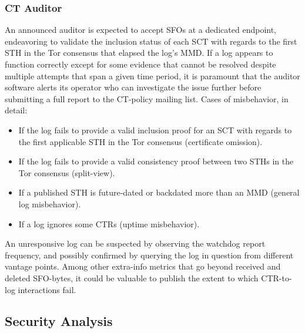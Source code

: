 \subsubsection{CT Auditor} \label{sec:auditor:auditor}
An announced auditor is expected to accept SFOs at a dedicated endpoint,
endeavoring to validate the inclusion status of each SCT with regards to the
first STH in the Tor consensus that elapsed the log's MMD.  If a log appears to
function correctly except for some evidence that cannot be
resolved despite multiple attempts that span a given time period, it is
paramount that the auditor software alerts its operator who can investigate
the issue further before submitting a full report to the CT-policy mailing list.
Cases of misbehavior, in detail:
\begin{itemize}
	\item If the log fails to provide a valid inclusion proof for an SCT with
		regards to the first applicable STH in the Tor consensus
		(certificate omission).
	\item If the log fails to provide a valid consistency proof between two
		STHs in the Tor consensus
		(split-view).
	\item If a published STH is future-dated or backdated more than an MMD
		(general log misbehavior).
	\item If a log ignores some CTRs (uptime misbehavior).
\end{itemize}

An unresponsive log can be suspected by observing the watchdog report frequency,
and possibly confirmed by querying the log in question from different vantage
points.  Among other extra-info metrics that go beyond received and deleted
SFO-bytes, it could be valuable to publish the extent to which CTR-to-log
interactions fail.


\subsection{Security Analysis} \label{sec:auditor:analysis}
